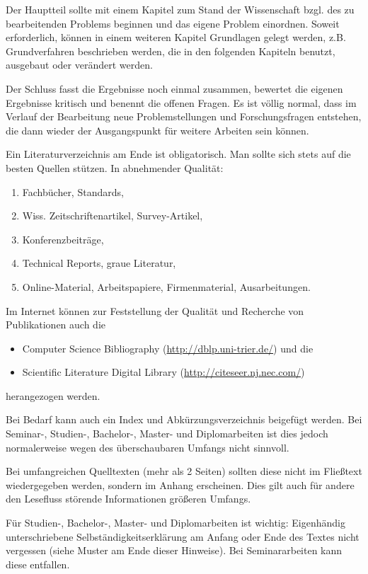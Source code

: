 \documentclass[12pt]{scrartcl}
\begin{document}
Der Hauptteil sollte mit einem Kapitel zum Stand der Wissenschaft bzgl. des zu bearbeitenden Problems beginnen und das eigene Problem einordnen. Soweit erforderlich, können in einem weiteren Kapitel Grundlagen gelegt werden, z.B. Grundverfahren beschrieben werden, die in den folgenden Kapiteln benutzt, ausgebaut oder verändert werden.

Der Schluss fasst die Ergebnisse noch einmal zusammen, bewertet die eigenen Ergebnisse kritisch und benennt die offenen Fragen. Es ist völlig normal, dass im Verlauf der Bearbeitung neue Problemstellungen und Forschungsfragen entstehen, die dann wieder der Ausgangspunkt für weitere Arbeiten sein können.

Ein Literaturverzeichnis am Ende ist obligatorisch. Man sollte sich stets auf die besten Quellen stützen. In abnehmender Qualität: 
\begin{enumerate}
\item Fachbücher, Standards, 
\item Wiss. Zeitschriftenartikel, Survey-Artikel,
\item Konferenzbeiträge,
\item Technical Reports, graue Literatur,
\item Online-Material, Arbeitspapiere, Firmenmaterial, Ausarbeitungen.
\end{enumerate}
Im Internet können zur Feststellung der Qualität und Recherche von Publikationen auch die
\begin{itemize}
\item Computer Science Bibliography (\url{http://dblp.uni-trier.de/}) und die
\item Scientific Literature Digital Library (\url{http://citeseer.nj.nec.com/})
\end{itemize}
herangezogen werden.

Bei Bedarf kann auch ein Index und Abkürzungsverzeichnis beigefügt werden. Bei Seminar-, Studien-, Bachelor-, Master- und Diplomarbeiten ist dies jedoch normalerweise wegen des überschaubaren Umfangs nicht sinnvoll.

Bei umfangreichen Quelltexten (mehr als 2 Seiten) sollten diese nicht im Fließtext wiedergegeben werden, sondern im Anhang erscheinen. Dies gilt auch für andere den Lesefluss störende Informationen größeren Umfangs. 

Für Studien-, Bachelor-, Master- und Diplomarbeiten ist wichtig: Eigenhändig unterschriebene Selbständigkeitserklärung am Anfang oder Ende des Textes nicht vergessen (siehe Muster am Ende dieser Hinweise). Bei Seminararbeiten kann diese entfallen.
\end{document}
